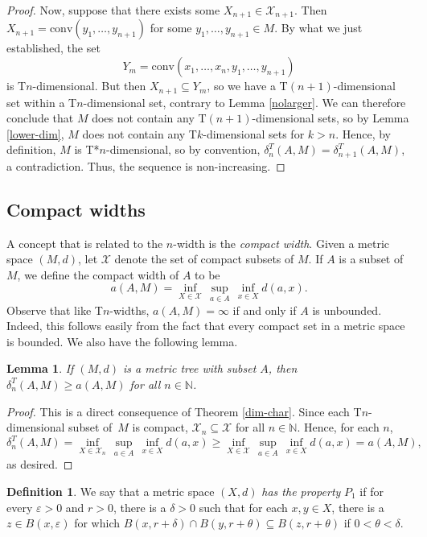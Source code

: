 \documentclass{bcp92}
\theoremstyle{plain}
\newtheorem{lem}[thm]{Lemma}
\theoremstyle{definition}
\newtheorem{defi}[thm]{Definition}
\begin{document}
\begin{proof}
Now, suppose that there exists some $X_{n+1} \in \mathcal{X}_{n+1}$. Then
$X_{n+1} = \text{conv}(y_1, \dots, y_{n+1})$ for some $y_1, \dots, y_{n+1}
\in M$. By what we just established, the set
$$
Y_m = \text{conv}(x_1, \dots, x_{n}, y_1, \dots, y_{n+1})
$$
is T$n$-dimensional. But then $X_{n+1} \subseteq Y_m$, so we have a
T$(n+1)$-dimensional set within a T$n$-dimensional set, contrary to Lemma
\ref{nolarger}. We can therefore conclude that $M$ does not contain any
T$(n+1)$-dimensional sets, so by Lemma \ref{lower-dim}, $M$ does not contain
any T$k$-dimensional sets for $k > n$. Hence, by definition, $M$ is
T*$n$-dimensional, so by convention, $\delta_n^T(A,M) = \delta_{n+1}^T(A,M)$,
a contradiction. Thus, the sequence is non-increasing.
\end{proof}

\subsection{Compact widths}
A concept that is related to the $n$-width is the \textit{compact width}.
Given a metric space $(M,d)$, let $\mathcal{X}$ denote the set of compact
subsets of $M$. If $A$ is a subset of $M$, we define the compact width of $A$
to be
$$
a(A,M) = \inf_{X \in \mathcal{X}} \,\sup_{a \in A} \,\inf_{x \in X} d(a,x).
$$
Observe that like T$n$-widths, $a(A,M) = \infty$ if and only if $A$ is
unbounded. Indeed, this follows easily from the fact that every compact set
in a metric space is bounded. We also have the following lemma.

\begin{lem} \label{geq}
If $(M,d)$ is a metric tree with subset $A$, then  $\delta_n^T(A,M) \geq
a(A,M)$ for all $n \in \mathbb{N}$.
\end{lem}

\begin{proof}
This is a direct consequence of Theorem \ref{dim-char}. Since each
T$n$-dimensional subset of~$M$ is compact, $\mathcal{X}_n \subseteq
\mathcal{X}$ for all $n \in \mathbb{N}$. Hence, for each $n$,
$$
\delta_n^T(A,M) = \inf_{X \in \mathcal{X}_n} \,\sup_{a \in A} \,\inf_{x \in
X} d(a,x) \geq
\inf_{X \in \mathcal{X}} \,\sup_{a \in A} \,\inf_{x \in X} d(a,x) = a(A,M),
$$
as desired.
\end{proof}

\begin{defi}
We say that a metric space $(X,d)$ \textit{has the property} $P_1$ if for every
$\varepsilon > 0$ and $r > 0$, there is a $\delta > 0$ such that for each
$x,y \in X$, there is a $z \in B(x,\varepsilon)$ for which $B(x,r+\delta)
\cap B(y,r+\theta) \subseteq B(z,r+\theta)$ if $0 < \theta < \delta$.
\end{defi}
\end{document}
